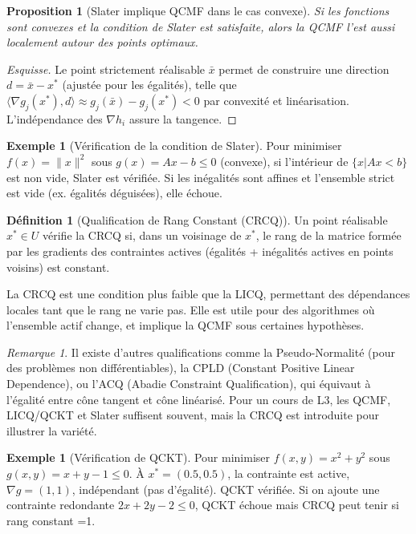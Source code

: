 \documentclass[a4paper,12pt,openany]{book}
\theoremstyle{plain}
\newtheorem{proposition}[theorem]{Proposition}
\theoremstyle{definition}
\newtheorem{definition}[theorem]{Définition}
\newtheorem{example}[theorem]{Exemple}
\theoremstyle{remark}
\newtheorem{remark}[theorem]{Remarque}
\theoremstyle{nbstyle}
\begin{document}
	\begin{proposition}[Slater implique QCMF dans le cas convexe]
		Si les fonctions sont convexes et la condition de Slater est satisfaite, alors la QCMF l'est aussi localement autour des points optimaux.
	\end{proposition}
	
	\begin{proof}[Esquisse]
		Le point strictement réalisable \( \bar{x} \) permet de construire une direction \( d = \bar{x} - x^* \) (ajustée pour les égalités), telle que \( \langle \nabla g_j(x^*), d \rangle \approx g_j(\bar{x}) - g_j(x^*) < 0 \) par convexité et linéarisation. L'indépendance des \( \nabla h_i \) assure la tangence.
	\end{proof}
	
	\begin{example}[Vérification de la condition de Slater]
		Pour minimiser \( f(x) = \|x\|^2 \) sous \( g(x) = A x - b \leq 0 \) (convexe), si l'intérieur de $ \{x | A x < b\} $ est non vide, Slater est vérifiée. Si les inégalités sont affines et l'ensemble strict est vide (ex. égalités déguisées), elle échoue.
	\end{example}
	
	\begin{definition}[Qualification de Rang Constant (CRCQ)]
		Un point réalisable \( x^* \in U \) vérifie la CRCQ si, dans un voisinage de \( x^* \), le rang de la matrice formée par les gradients des contraintes actives (égalités + inégalités actives en points voisins) est constant.
	\end{definition}
	
	La CRCQ est une condition plus faible que la LICQ, permettant des dépendances locales tant que le rang ne varie pas. Elle est utile pour des algorithmes où l'ensemble actif change, et implique la QCMF sous certaines hypothèses.
	
	\begin{remark}
		Il existe d'autres qualifications comme la Pseudo-Normalité (pour des problèmes non différentiables), la CPLD (Constant Positive Linear Dependence), ou l'ACQ (Abadie Constraint Qualification), qui équivaut à l'égalité entre cône tangent et cône linéarisé. Pour un cours de L3, les QCMF, LICQ/QCKT et Slater suffisent souvent, mais la CRCQ est introduite pour illustrer la variété.
	\end{remark}
	
	\begin{example}[Vérification de QCKT]
		Pour minimiser \( f(x,y) = x^2 + y^2 \) sous \( g(x,y) = x + y - 1 \leq 0 \). À \( x^* = (0.5, 0.5) \), la contrainte est active, \( \nabla g = (1,1) \), indépendant (pas d'égalité). QCKT vérifiée. Si on ajoute une contrainte redondante \( 2x + 2y - 2 \leq 0 \), QCKT échoue mais CRCQ peut tenir si rang constant =1.
	\end{example}
	
\end{document}
